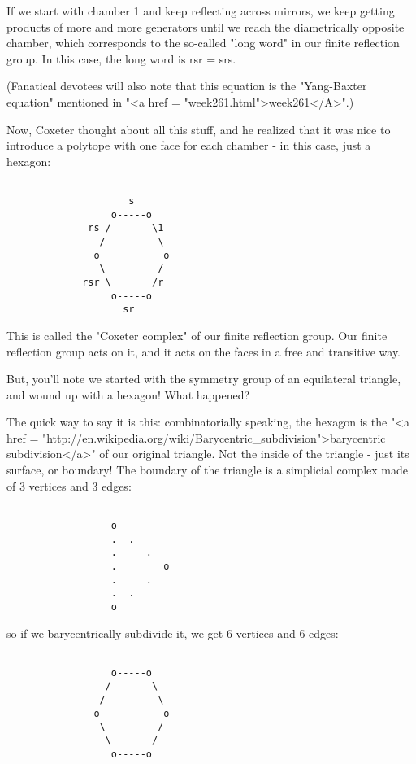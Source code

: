 If we start with chamber 1 and keep reflecting across mirrors, 
we keep getting products of more and more generators until we 
reach the diametrically opposite chamber, which corresponds to 
the so-called "long word" in our finite reflection group.  In 
this case, the long word is rsr = srs.

(Fanatical devotees will also note that this equation is the
"Yang-Baxter equation" mentioned in "<a href = "week261.html">week261</A>".)

Now, Coxeter thought about all this stuff, and he realized
that it was nice to introduce a polytope with one face for 
each chamber - in this case, just a hexagon:
 

\begin{verbatim}

                     s
                  o-----o
              rs /       \1 
                /         \
               o           o
                \         / 
             rsr \       /r
                  o-----o
                    sr
\end{verbatim}
    
This is called the "Coxeter complex" of our finite reflection
group.  Our finite reflection group acts on it, and it acts
on the faces in a free and transitive way. 

But, you'll note we started with the symmetry group of an 
equilateral triangle, and wound up with a hexagon!  What happened?

The quick way to say it is this: combinatorially speaking,
the hexagon is the "<a href = "http://en.wikipedia.org/wiki/Barycentric_subdivision">barycentric subdivision</a>" of our original
triangle.  Not the inside of the triangle - just its surface,
or boundary!  The boundary of the triangle is a simplicial 
complex made of 3 vertices and 3 edges:
                     

\begin{verbatim}

                  o
                  .  .   
                  .     . 
                  .        o
                  .     .  
                  .  .
                  o
\end{verbatim}
    
so if we barycentrically subdivide it, we get 6 vertices
and 6 edges:
                     

\begin{verbatim}

                  o-----o
                 /       \
                /         \
               o           o
                \         / 
                 \       /
                  o-----o
\end{verbatim}
    

